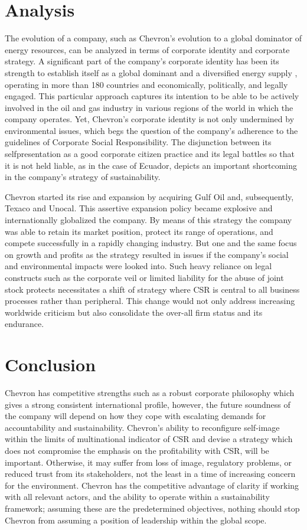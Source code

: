 \documentclass[12pt,letterpaper]{article}
\begin{document}
\section{Analysis}
    The evolution of a company, such as Chevron’s evolution to a global dominator of energy resources, can be analyzed in terms of corporate identity and corporate strategy. A significant part of the company’s corporate identity has been its strength to establish itself as a global dominant and a diversified energy supply , operating in more than 180 countries and economically, politically, and legally engaged. This particular approach captures its intention to be able to be actively involved in the oil and gas industry in various regions of the world in which the company operates. Yet, Chevron’s corporate identity is not only undermined by environmental issues, which begs the question of the company’s adherence to the guidelines of Corporate Social Responsibility. The disjunction between its selfpresentation as a good corporate citizen practice and its legal battles so that it is not held liable, as in the case of Ecuador, depicts an important shortcoming in the company’s strategy of sustainability.

    Chevron started its rise and expansion by acquiring Gulf Oil and, subsequently, Texaco and Unocal. This assertive expansion policy became explosive and internationally globalized the company. By means of this strategy the company was able to retain its market position, protect its range of operations, and compete successfully in a rapidly changing industry. But one and the same focus on growth and profits as the strategy resulted in issues if the company’s social and environmental impacts were looked into. Such heavy reliance on legal constructs such as the corporate veil or limited liability for the abuse of joint stock protects necessitates a shift of strategy where CSR is central to all business processes rather than peripheral. This change would not only address increasing worldwide criticism but also consolidate the over-all firm status and its endurance.



\section{Conclusion}
    Chevron has competitive strengths such as a robust corporate philosophy which gives a strong consistent international profile, however, the future soundness of the company will depend on how they cope with escalating demands for accountability and sustainability.  Chevron’s ability to reconfigure self-image within the limits of multinational indicator of CSR and devise a strategy which does not compromise the emphasis on the profitability with CSR, will be important. Otherwise, it may suffer from loss of image, regulatory problems, or reduced trust from its stakeholders, not the least in a time of increasing concern for the environment. Chevron has the competitive advantage of clarity if working with all relevant actors, and the ability to operate within a sustainability framework; assuming these are the predetermined objectives, nothing should stop Chevron from assuming a position of leadership within the global scope.


\newpage


\cite{Curley}
\cite{Statista}
\cite{David}
\cite{Cass}
\end{document}
